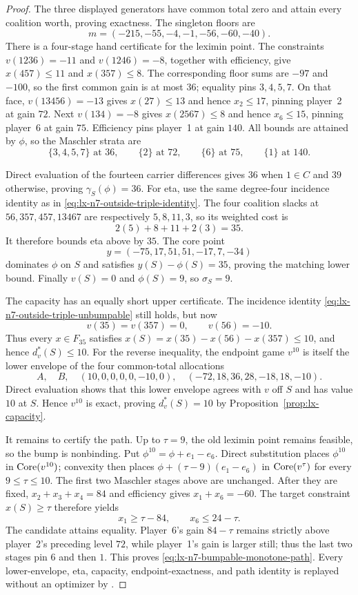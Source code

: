 \begin{proof}
The three displayed generators have common total zero and attain every
coalition worth, proving exactness.  The singleton floors are
\[
 m=(-215,-55,-4,-1,-56,-60,-40).
\]
There is a four-stage hand certificate for the leximin point.  The constraints
$v(1236)=-11$ and $v(1246)=-8$, together with efficiency, give
$x(457)\leq11$ and $x(357)\leq8$.  The corresponding floor sums are $-97$
and $-100$, so the first common gain is at most $36$; equality pins
$3,4,5,7$.  On that face, $v(13456)=-13$ gives $x(27)\leq13$ and hence
$x_2\leq17$, pinning player~2 at gain $72$.  Next $v(134)=-8$ gives
$x(2567)\leq8$ and hence $x_6\leq15$, pinning player~6 at gain $75$.
Efficiency pins player~1 at gain $140$.  All bounds are attained by $\phi$,
so the Maschler strata are
\[
 \{3,4,5,7\}\text{ at }36,\qquad
 \{2\}\text{ at }72,\qquad
 \{6\}\text{ at }75,\qquad
 \{1\}\text{ at }140.
\]

Direct evaluation of the fourteen carrier differences gives $36$ when
$1\in C$ and $39$ otherwise, proving $\gamma_S(\phi)=36$.  For eta, use the
same degree-four incidence identity as in
\eqref{eq:lx-n7-outside-triple-identity}.  The four coalition slacks at
$56,357,457,13467$ are respectively $5,8,11,3$, so its weighted cost is
\[
 2(5)+8+11+2(3)=35.
\]
It therefore bounds eta above by $35$.  The core point
\[
 y=(-75,17,51,51,-17,7,-34)
\]
dominates $\phi$ on $S$ and satisfies $y(S)-\phi(S)=35$, proving the matching
lower bound.  Finally $v(S)=0$ and $\phi(S)=9$, so $\sigma_S=9$.

The capacity has an equally short upper certificate.  The incidence identity
\eqref{eq:lx-n7-outside-triple-unbumpable} still holds, but now
\[
 v(35)=v(357)=0,\qquad v(56)=-10.
\]
Thus every $x\in F_{35}$ satisfies
$x(S)=x(35)-x(56)-x(357)\leq10$, and hence $d_v^*(S)\leq10$.
For the reverse inequality, the endpoint game $v^{10}$ is itself the lower
envelope of the four common-total allocations
\[
 A,\quad B,\quad
 (10,0,0,0,0,-10,0),\quad
 (-72,18,36,28,-18,18,-10).
\]
Direct evaluation shows that this lower envelope agrees with $v$ off $S$ and
has value $10$ at $S$.  Hence $v^{10}$ is exact, proving $d_v^*(S)=10$ by
Proposition~\ref{prop:lx-capacity}.

It remains to certify the path.  Up to $\tau=9$, the old leximin point remains
feasible, so the bump is nonbinding.  Put
$\phi^{10}=\phi+e_1-e_6$.  Direct substitution places $\phi^{10}$ in
$\operatorname{Core}(v^{10})$; convexity then places
$\phi+(\tau-9)(e_1-e_6)$ in $\operatorname{Core}(v^\tau)$ for every $9\leq\tau\leq10$.
The first two Maschler stages above are unchanged.  After they are fixed,
$x_2+x_3+x_4=84$ and efficiency gives $x_1+x_6=-60$.  The target constraint
$x(S)\geq\tau$ therefore yields
\[
 x_1\geq\tau-84,\qquad x_6\leq24-\tau.
\]
The candidate attains equality.  Player~6's gain $84-\tau$ remains strictly
above player~2's preceding level $72$, while player~1's gain is larger still;
thus the last two stages pin $6$ and then $1$.  This proves
\eqref{eq:lx-n7-bumpable-monotone-path}.  Every lower-envelope, eta,
capacity, endpoint-exactness, and path identity is replayed without an
optimizer by .
\end{proof}

